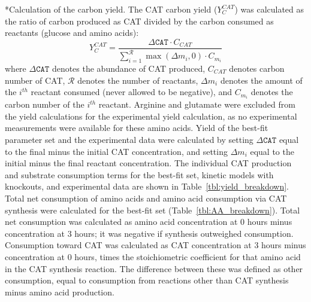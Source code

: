 \documentclass[12pt]{article}
\makeatletter
\renewcommand\subsection{\@startsection
	{subsection}{2}{0mm}
	{-0.05in}
	{-0.5\baselineskip}
	{\normalfont\normalsize\bfseries}}
\makeatother
\begin{document}
\subsection*{Calculation of the carbon yield.}
The CAT carbon yield ($Y_{C}^{CAT}$) was calculated as the ratio of carbon produced as CAT divided by the carbon consumed as reactants (glucose and amino acids):
\begin{equation}\label{eqn:yield-definition}
	Y_{C}^{CAT}=\frac{\Delta\texttt{CAT}\cdot C_{CAT}}{\displaystyle\sum_{i=1}^{\mathcal{R}}\max(\Delta m_{i},0)\cdot C_{m_i}}
\end{equation}
where $\Delta\texttt{CAT}$ denotes the abundance of CAT produced, $C_{CAT}$ denotes carbon number of CAT, $\mathcal{R}$ denotes the number of reactants,
$\Delta m_{i}$ denotes the amount of the $i^{th}$ reactant consumed (never allowed to be negative), and $C_{m_i}$ denotes the carbon number of the $i^{th}$ reactant.
Arginine and glutamate were excluded from the yield calculations for the experimental yield calculation, as no experimental measurements were available for these amino acids.
Yield of the best-fit parameter set and the experimental data were calculated by setting $\Delta\texttt{CAT}$ equal to the final minus the initial CAT concentration,
and setting $\Delta m_{i}$ equal to the initial minus the final reactant concentration.
The individual CAT production and substrate consumption terms for the best-fit set, kinetic models with knockouts, and experimental data are shown in Table~\ref{tbl:yield_breakdown}.
Total net consumption of amino acids and amino acid consumption via CAT synthesis were calculated for the best-fit set (Table~\ref{tbl:AA_breakdown}).
Total net consumption was calculated as amino acid concentration at 0 hours minus concentration at 3 hours; it was negative if synthesis outweighed consumption.
Consumption toward CAT was calculated as CAT concentration at 3 hours minus concentration at 0 hours, times the stoichiometric coefficient for that amino acid in the CAT synthesis reaction.
The difference between these was defined as other consumption, equal to consumption from reactions other than CAT synthesis minus amino acid production.
\end{document}
